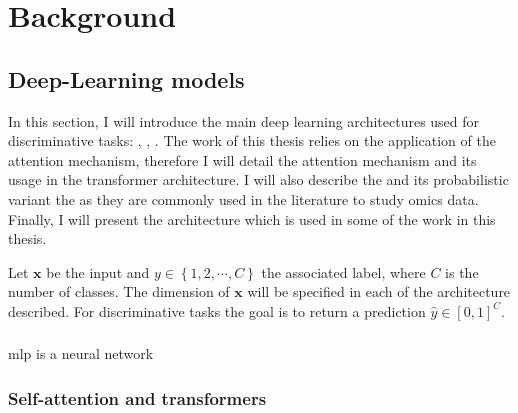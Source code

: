 \documentclass[../main.tex]{subfiles}
\begin{document}
\chapter{Background}\label{chap:background}
\minitocpage

\section{Deep-Learning models}
 In this section, I will introduce the main deep learning architectures used for discriminative tasks: , , .
 The work of this thesis relies on the application of the attention mechanism, therefore I will detail the attention mechanism and its usage in the transformer architecture.
 I will also describe the  and its probabilistic variant the  as they are commonly used in the literature to study omics data.
 Finally, I will present the  architecture which is used in some of the work in this thesis.

 Let \(\symbf{x}\) be the input and \(y \in \left\{1,2, \cdots, C \right\} \) the associated label, where \(C\) is the number of classes.
 The dimension of \(\symbf{x}\) will be specified in each of the architecture described.
 For discriminative tasks the goal is to return a prediction \(\hat{y} \in \left[0,1\right]^C\).


 \subsection{}
     \Gls{mlp} is a neural network

 \subsection{}

 \subsection{}

 \subsection{Self-attention and transformers}

 \subsection{}
\end{document}
